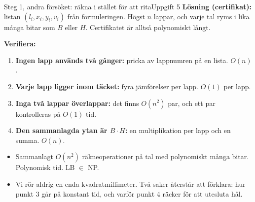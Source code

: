 \documentclass[aspectratio=169,10pt]{beamer}
\newcommand{\prob}[1]{\textsc{#1}}
\begin{document}
\begin{frame}{Steg 1, andra försöket: räkna i stället för att rita}{Uppgift 5}
  \textbf{Lösning (certifikat):} listan $(l_i,x_i,y_i,v_i)$ från formuleringen. Högst $n$ lappar, och varje tal ryms i lika många bitar som $B$ eller $H$. Certifikatet är alltså polynomiskt långt.

  \medskip
  \textbf{Verifiera:}
  \begin{enumerate}
    \item<2-> \textbf{Ingen lapp används två gånger:} pricka av lappnumren på en lista. $O(n)$.
    \item<3-> \textbf{Varje lapp ligger inom täcket:} fyra jämförelser per lapp. $O(1)$ per lapp.
    \item<4-> \textbf{Inga två lappar överlappar:} det finns $O(n^2)$ par, och ett par kontrolleras på $O(1)$ tid.
    \item<5-> \textbf{Den sammanlagda ytan är $B\cdot H$:} en multiplikation per lapp och en summa. $O(n)$.
  \end{enumerate}
  \begin{itemize}
    \item<6-> Sammanlagt $O(n^2)$ räkneoperationer på tal med polynomiskt många bitar. Polynomisk tid. \prob{LB} $\in$ NP.
    \item<7-> Vi rör aldrig en enda kvadratmillimeter. Två saker återstår att förklara: hur punkt 3 går på konstant tid, och varför punkt 4 räcker för att utesluta hål.
  \end{itemize}
\end{frame}
\end{document}
